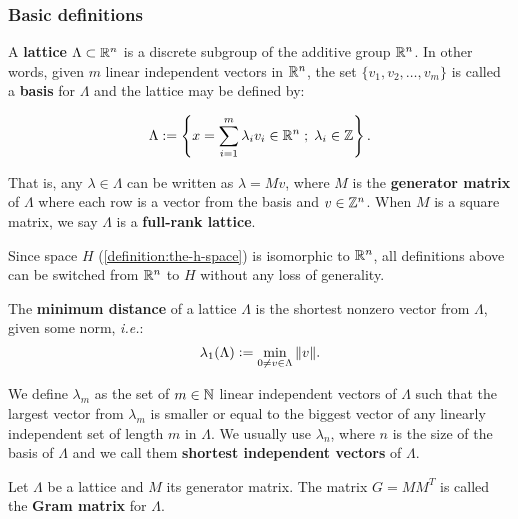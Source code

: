 \documentclass[a4paper,12pt]{article}
\begin{document}
\subsubsection{Basic definitions}
\label{sec:org4ca835e}
\begin{definition}
  A \textbf{lattice} $\Lambda \subset \mathbb{R}^n$ is a discrete subgroup of the additive group $\mathbb{R}^n$.  In other words, given $m$ linear independent vectors in $\mathbb{R}^n$, the set
  $\{v_1, v_2, \dots, v_m\}$ is called a \textbf{basis} for $\Lambda$ and the lattice may be defined
  by:

  \begin{equation*}
    \Lambda := \left\{x = \sum_{i=1}^m{\lambda_i v_i} \in \mathbb{R}^n \; ; \; \lambda_i \in \mathbb{Z}\right\}.
  \end{equation*}

  That is, any $\lambda \in \Lambda$ can be written as $\lambda = Mv$, where $M$ is the
  \textbf{generator matrix} of $\Lambda$ where each row is a vector from the basis and
  $v \in \mathbb{Z}^n$. When $M$ is a square matrix, we say $\Lambda$ is a
  \textbf{full-rank lattice}.
\end{definition}


\begin{text}
  Since space \(H\) (\ref{definition:the-h-space}) is isomorphic to \(\mathbb{R}^n\), all definitions above can be switched from \(\mathbb{R}^n\) to \(H\) without any loss of generality.

\end{text}

\begin{definition}
  The \textbf{minimum distance} of a lattice $\Lambda$ is the shortest nonzero vector
  from $\Lambda$, given some norm, \textit{i.e.}:
  $$
  \lambda_1(\Lambda) \vcentcolon = \min_{0 \ne v \in \Lambda}{\|v\|}.
  $$

  We define $\lambda_m$ as the set of $m \in \mathbb{N}$  linear independent vectors of $\Lambda$
  such that the largest vector from $\lambda_m$ is smaller or equal to the biggest vector of any linearly independent set of length $m$ in $\Lambda$. We usually use
  $\lambda_n$, where $n$ is the size of the basis of $\Lambda$ and we call them
  \textbf{shortest independent vectors} of $\Lambda$.
\end{definition}

\begin{definition}\label{definition:gram-matrix}
  Let $\Lambda$ be a lattice and $M$ its generator matrix. The matrix $G = MM^T$ is called the \textbf{Gram matrix} for $\Lambda$.
\end{definition}
\end{document}
